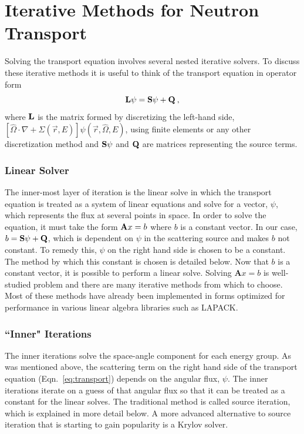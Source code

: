 
\section{Iterative Methods for Neutron Transport}
Solving the transport equation involves several nested iterative solvers. To discuss these iterative methods it is useful to think of the transport equation in operator form
\begin{equation}
    \bf{L}\psi = \bf{S}\psi + \bf{Q} \:,
\end{equation}
where $\bf{L}$ is the matrix formed by discretizing the left-hand side, $[\hat{\Omega} \cdot \nabla + \Sigma(\vec{r}, E)]\psi(\vec{r}, \hat{\Omega}, E)$, using finite elements or any other discretization method and $\bf{S}\psi$ and $\bf{Q}$ are matrices representing the source terms. 

\subsubsection{Linear Solver}
The inner-most layer of iteration is the linear solve in which the transport equation is treated as a system of linear equations and solve for a vector, $\psi$, which represents the flux at several points in space. In order to solve the equation, it must take the form ${\bf A} x = b$ where $b$ is a constant vector. In our case, $b = {\bf S} \psi + {\bf Q}$, which is dependent on $\psi$ in the scattering source and makes $b$ not constant. To remedy this, $\psi$ on the right hand side is chosen to be a constant. The method by which this constant is chosen is detailed below. Now that $b$ is a constant vector, it is possible to perform a linear solve. Solving $\textbf{A}x = b$ is well-studied problem and there are many iterative methods from which to choose. Most of these methods have already been implemented in forms optimized for performance in various linear algebra libraries such as LAPACK.

\subsubsection{``Inner" Iterations}
The inner iterations solve the space-angle component for each energy group. As was mentioned above, the scattering term on the right hand side of the transport equation (Eqn.~\ref{eq:transport}) depends on the angular flux, $\psi$. The inner iterations iterate on a guess of that angular flux so that it can be treated as a constant for the linear solves. The traditional method is called source iteration, which is explained in more detail below. A more advanced alternative to source iteration that is starting to gain popularity is a Krylov solver. 

